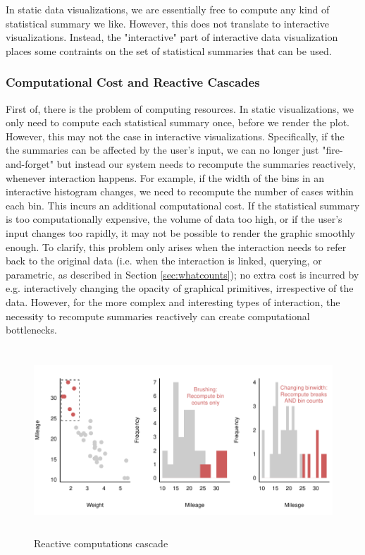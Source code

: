 \documentclass[12pt,a4paper]{article}
\begin{document}
In static data visualizations, we are essentially free to compute any kind of statistical summary we like. However, this does not translate to interactive visualizations. Instead, the "interactive" part of interactive data visualization places some contraints on the set of statistical summaries that can be used.  

\subsubsection{Computational Cost and Reactive Cascades}

First of, there is the problem of computing resources. In static visualizations, we only need to compute each statistical summary once, before we render the plot. However, this may not the case in interactive visualizations. Specifically, if the the summaries can be affected by the user's input, we can no longer just "fire-and-forget" but instead our system needs to recompute the summaries reactively, whenever interaction happens. For example, if the width of the bins in an interactive histogram changes, we need to recompute the number of cases within each bin. This incurs an additional computational cost. If the statistical summary is too computationally expensive, the volume of data too high, or if the user's input changes too rapidly, it may not be possible to render the graphic smoothly enough. To clarify, this problem only arises when the interaction needs to refer back to the original data (i.e. when the interaction is linked, querying, or parametric, as described in Section \ref{sec:whatcounts}); no extra cost is incurred by e.g. interactively changing the opacity of graphical primitives, irrespective of the data. However, for the more complex and interesting types of interaction, the necessity to recompute summaries reactively can create computational bottlenecks.   

\begin{figure}[H]
\centering
\includegraphics[height=70mm]{./figure03.pdf}
\caption{Reactive computations cascade}
\label{fig:reactivecascade}
\end{figure}
\end{document}
